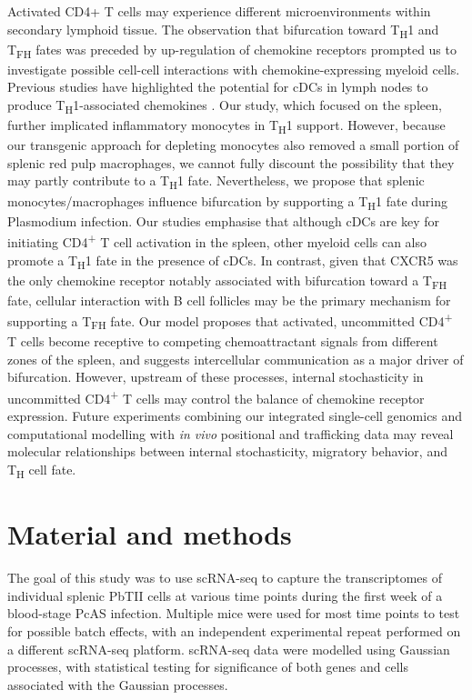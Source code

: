 Activated CD4+ T cells may experience different microenvironments within secondary lymphoid tissue. The observation that bifurcation toward T\textsubscript{H}1 and T\textsubscript{FH} fates was preceded by up-regulation of chemokine receptors prompted us to investigate possible cell-cell interactions with chemokine-expressing myeloid cells. Previous studies have highlighted the potential for cDCs in lymph nodes to produce T\textsubscript{H}1-associated chemokines \cite{Groom2012-az}. Our study, which focused on the spleen, further implicated inflammatory monocytes in T\textsubscript{H}1 support. However, because our transgenic approach for depleting monocytes also removed a small portion of splenic red pulp macrophages, we cannot fully discount the possibility that they may partly contribute to a T\textsubscript{H}1 fate. Nevertheless, we propose that splenic monocytes/macrophages influence bifurcation by supporting a T\textsubscript{H}1 fate during Plasmodium infection. Our studies emphasise that although cDCs are key for initiating CD4\textsuperscript{+} T cell activation in the spleen, other myeloid cells can also promote a T\textsubscript{H}1 fate in the presence of cDCs. In contrast, given that CXCR5 was the only chemokine receptor notably associated with bifurcation toward a T\textsubscript{FH} fate, cellular interaction with B cell follicles may be the primary mechanism for supporting a T\textsubscript{FH} fate. Our model proposes that activated, uncommitted CD4\textsuperscript{+} T cells become receptive to competing chemoattractant signals from different zones of the spleen, and suggests intercellular communication as a major driver of bifurcation. However, upstream of these processes, internal stochasticity in uncommitted CD4\textsuperscript{+} T cells may control the balance of chemokine receptor expression. Future experiments combining our integrated single-cell genomics and computational modelling with \textit{in vivo} positional and trafficking data may reveal molecular relationships between internal stochasticity, migratory behavior, and T\textsubscript{H} cell fate.

\section{Material and methods}

The goal of this study was to use scRNA-seq to capture the transcriptomes of individual splenic PbTII cells at various time points during the first week of a blood-stage PcAS infection. Multiple mice were used for most time points to test for possible batch effects, with an independent experimental repeat performed on a different scRNA-seq platform. scRNA-seq data were modelled using Gaussian processes, with statistical testing for significance of both genes and cells associated with the Gaussian processes.

